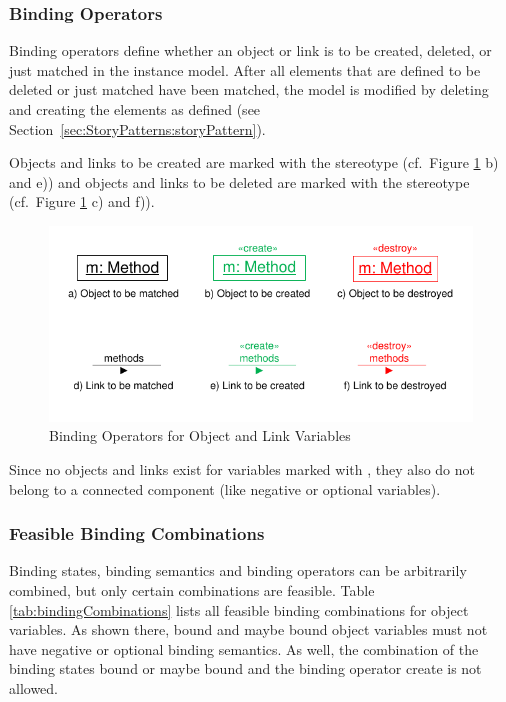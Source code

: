 \subsubsection{Binding Operators}
\label{sec:StoryPatterns:binding:operators}

Binding operators define whether an object or link is to be created, deleted,
or just matched in the instance model.
After all elements that are defined to be deleted or just matched have been
matched, the model is modified by deleting and creating the elements as
defined (see Section~\ref{sec:StoryPatterns:storyPattern}).

Objects and links to be created are marked with the
stereotype \create (cf.\ Figure \ref{fig:bindingOperatorsOverview} b) and e)) and objects and links
to be deleted are marked with the stereotype \destroy (cf.\ Figure
\ref{fig:bindingOperatorsOverview} c) and f)).

\begin{figure}[htb]
  \centering
  \includegraphics[scale=1.2]{figures/BindingOperatorsOverview}
  \caption{Binding Operators for Object and Link Variables}
  \label{fig:bindingOperatorsOverview}
\end{figure}

Since no objects and links exist for variables marked with \create, they also do not belong to a connected component (like
negative or optional variables).


\subsubsection{Feasible Binding Combinations}

Binding states, binding semantics and binding operators can be
arbitrarily combined, but only certain combinations are feasible. 
Table \ref{tab:bindingCombinations} lists all feasible binding combinations for
object variables. As shown there, bound and maybe bound object variables must not have negative
or optional binding semantics. As well, the combination of the binding states
bound or maybe bound and the binding operator create is not allowed.

